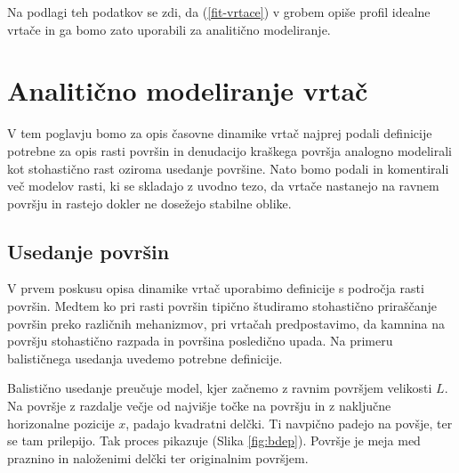 \documentclass[a4paper, twoside, 12pt]{book}
\begin{document}
  Na podlagi teh podatkov se zdi, da (\ref{fit-vrtace}) v grobem opiše profil idealne vrtače in ga bomo zato uporabili za analitično modeliranje.

  \chapter{Analitično modeliranje vrtač}
  \label{analiticno-modeliranje}

V tem poglavju bomo za opis časovne dinamike vrtač najprej podali definicije potrebne za opis rasti površin in denudacijo kraškega površja analogno modelirali kot stohastično rast oziroma usedanje površine. Nato bomo podali in komentirali več modelov rasti, ki se skladajo z uvodno tezo, da vrtače nastanejo na ravnem površju in rastejo dokler ne dosežejo stabilne oblike.

  \section{Usedanje površin}
  \label{definicije}

  V prvem poskusu opisa dinamike vrtač uporabimo definicije s področja rasti površin. Medtem ko pri rasti površin tipično študiramo stohastično priraščanje površin preko različnih mehanizmov, pri vrtačah predpostavimo, da kamnina na površju stohastično razpada in površina posledično upada. Na primeru balističnega usedanja uvedemo potrebne definicije. \cite{barabasi1995fractal}

Balistično usedanje preučuje model, kjer začnemo z ravnim površjem velikosti $L$. Na površje z razdalje večje od najvišje točke na površju in z naključne horizonalne pozicije $x$, padajo kvadratni delčki. Ti navpično padejo na povšje, ter se tam prilepijo. Tak proces pikazuje (Slika \ref{fig:bdep}).
Površje je meja med praznino in naloženimi delčki ter originalnim površjem.
\end{document}
